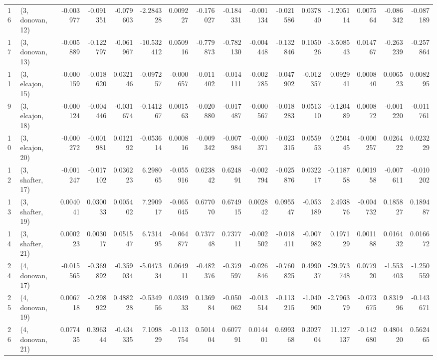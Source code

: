 \begin{tabular}{llrrrrrrrrrrrrrr}
16 &  (3, donovan, 12) &  -0.003977 & -0.091351 & -0.079603 &  -2.284328 &  0.009227 &  -0.176027 & -0.184331 & -0.001134 & -0.021586 &  0.037840 &  -1.205114 &  0.007564 & -0.086342 & -0.087189 \\
17 &  (3, donovan, 13) &  -0.005889 & -0.122797 & -0.061967 & -10.532412 &  0.050916 &  -0.779873 & -0.782130 & -0.004448 & -0.132846 &  0.105026 &  -3.508543 &  0.014767 & -0.263239 & -0.257864 \\
11 &  (3, elcajon, 15) &  -0.000159 & -0.018620 &  0.032146 &  -0.097257 & -0.000657 &  -0.011402 & -0.014111 & -0.002785 & -0.047902 & -0.012357 &   0.092941 &  0.000840 &  0.006523 &  0.008295 \\
9  &  (3, elcajon, 18) &  -0.000124 & -0.004446 & -0.031674 &  -0.141267 &  0.001563 &  -0.020880 & -0.017487 & -0.000567 & -0.018283 &  0.051310 &  -0.120489 &  0.000872 & -0.001220 & -0.011761 \\
10 &  (3, elcajon, 20) &  -0.000272 & -0.001981 &  0.012192 &  -0.053614 &  0.000816 &  -0.009342 & -0.007984 & -0.000371 & -0.023315 &  0.055953 &   0.250445 & -0.000257 &  0.026422 &  0.023229 \\
12 &  (3, shafter, 17) &  -0.001247 & -0.017102 &  0.036223 &   6.298065 & -0.055916 &   0.623842 &  0.624891 & -0.002794 & -0.025876 &  0.032217 &  -0.118758 &  0.001958 & -0.007611 & -0.010202 \\
13 &  (3, shafter, 19) &   0.004041 &  0.030033 &  0.005402 &   7.290917 & -0.065045 &   0.677070 &  0.674915 &  0.002842 &  0.095547 & -0.053189 &   2.493876 & -0.004732 &  0.185827 &  0.189487 \\
14 &  (3, shafter, 21) &   0.000223 &  0.003017 &  0.051547 &   6.731495 & -0.064877 &   0.737748 &  0.737711 & -0.002502 & -0.018411 & -0.007982 &   0.197129 &  0.001188 &  0.016432 &  0.016672 \\
24 &  (4, donovan, 17) &  -0.015565 & -0.369892 & -0.359034 &  -5.047334 &  0.064911 &  -0.482376 & -0.379597 & -0.026846 & -0.760825 &  0.499037 & -29.973748 &  0.077920 & -1.553403 & -1.250559 \\
25 &  (4, donovan, 19) &   0.006718 & -0.298922 &  0.488228 &  -0.534956 &  0.034933 &   0.136984 & -0.050062 & -0.013514 & -0.113215 & -1.040900 &  -2.796379 & -0.073675 &  0.831996 & -0.143671 \\
26 &  (4, donovan, 21) &   0.077435 &  0.396344 & -0.434335 &   7.109829 & -0.113754 &   0.501404 &  0.607791 &  0.014401 &  0.699368 &  0.302704 &  11.127137 & -0.142680 &  0.480420 &  0.562465 \\

\end{tabular}
